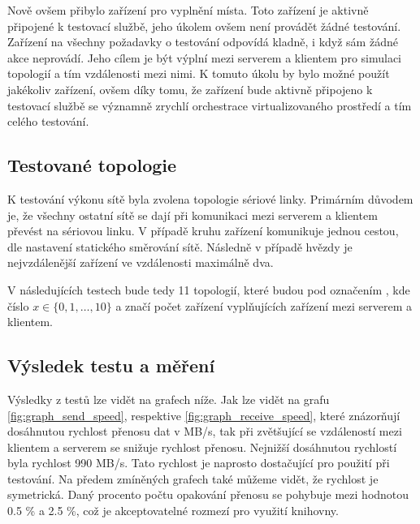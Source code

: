 Nově ovšem přibylo zařízení pro vyplnění místa. Toto zařízení je aktivně připojené k testovací službě, jeho úkolem ovšem není provádět žádné testování. Zařízení na všechny požadavky o testování odpovídá kladně, i když sám žádné akce neprovádí. Jeho cílem je být výplní mezi serverem a klientem pro simulaci topologií a tím vzdálenosti mezi nimi. K tomuto úkolu by bylo možné použít jakékoliv zařízení, ovšem díky tomu, že zařízení bude aktivně připojeno k testovací službě se významně zrychlí orchestrace virtualizovaného prostředí a tím celého testování.


\subsection{Testované topologie}

K testování výkonu sítě byla zvolena topologie sériové linky. Primárním důvodem je, že všechny ostatní sítě se dají při komunikaci mezi serverem a klientem převést na sériovou linku. V případě kruhu zařízení komunikuje jednou cestou, dle nastavení statického směrování sítě. Následně v případě hvězdy je nejvzdálenější zařízení ve vzdálenosti maximálně dva. 

V následujících testech bude tedy 11 topologií, které budou pod označením , kde číslo $x \in \{0,1,\dots, 10\}$ a značí počet zařízení vyplňujících zařízení mezi serverem a klientem.

\subsection{Výsledek testu a měření}

Výsledky z testů lze vidět na grafech níže. Jak lze vidět na grafu \ref{fig:graph_send_speed}, respektive \ref{fig:graph_receive_speed}, které znázorňují dosáhnutou rychlost přenosu dat v MB/s, tak při zvětšující se vzdáleností mezi klientem a serverem se snižuje rychlost přenosu. Nejnižší dosáhnutou rychlostí byla rychlost 990 MB/s. Tato rychlost je naprosto dostačující pro použití při testování. Na předem zmíněných grafech také můžeme vidět, že rychlost je symetrická. Daný procento počtu opakování přenosu se pohybuje mezi hodnotou 0.5 \% a 2.5 \%, což je akceptovatelné rozmezí pro využití knihovny.


